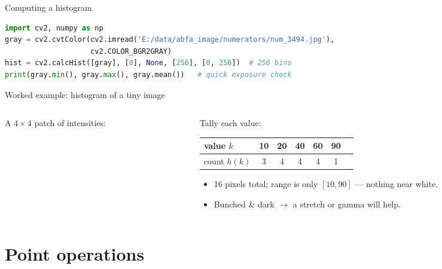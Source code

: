 \documentclass[10pt,aspectratio=169]{beamer}
\begin{document}
\begin{frame}[fragile]{Computing a histogram}
\begin{lstlisting}[language=Python]
import cv2, numpy as np
gray = cv2.cvtColor(cv2.imread('E:/data/abfa_image/numerators/num_3494.jpg'),
                    cv2.COLOR_BGR2GRAY)
hist = cv2.calcHist([gray], [0], None, [256], [0, 256])  # 256 bins
print(gray.min(), gray.max(), gray.mean())   # quick exposure check
\end{lstlisting}
\end{frame}

\begin{frame}{Worked example: histogram of a tiny image}
  \begin{columns}[T]
    \begin{column}{0.42\textwidth}
      A $4\times4$ patch of intensities:
      \begin{center}
      \end{center}
    \end{column}
    \begin{column}{0.58\textwidth}
      Tally each value:
      \begin{center}\footnotesize
      \begin{tabular}{lcccccc}
        \toprule
        value $k$ & 10 & 20 & 40 & 60 & 90 \\
        \midrule
        count $h(k)$ & 3 & 4 & 4 & 4 & 1 \\
        \bottomrule
      \end{tabular}
      \end{center}
      \begin{itemize}
        \item 16 pixels total; range is only $[10,90]$ — nothing near white.
        \item Bunched \& dark $\rightarrow$ a stretch or gamma will help.
      \end{itemize}
    \end{column}
  \end{columns}
\end{frame}

\section{Point operations}
\end{document}
